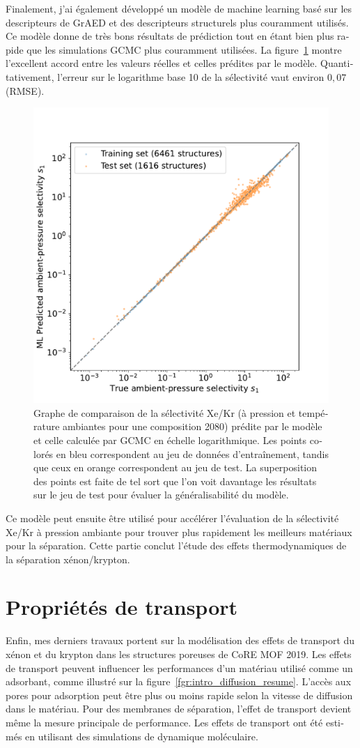 \documentclass[thesis]{subfiles}
\begin{document}
\begin{otherlanguage}{french}
Finalement, j'ai également développé un modèle de machine learning basé sur les descripteurs de GrAED et des descripteurs structurels plus couramment utilisés. Ce modèle donne de très bons résultats de prédiction tout en étant bien plus rapide que les simulations GCMC plus couramment utilisées. La figure~\ref{fgr:S1_prediction_resume} montre l'excellent accord entre les valeurs réelles et celles prédites par le modèle. Quantitativement, l'erreur sur le logarithme base 10 de la sélectivité vaut environ $0,07$ (RMSE).
\begin{figure}[ht]
\centering
    \includegraphics[width=0.48\linewidth]{figures/4-ml/SI_figure/Scatterplot_S1_prediction_logscale.pdf}
    \caption{Graphe de comparaison de la sélectivité Xe/Kr (à pression et température ambiantes pour une composition 20\pp{}80) prédite par le modèle et celle calculée par GCMC en échelle logarithmique. Les points colorés en bleu correspondent au jeu de données d'entraînement, tandis que ceux en orange correspondent au jeu de test. La superposition des points est faite de tel sort que l'on voit davantage les résultats sur le jeu de test pour évaluer la généralisabilité du modèle.}\label{fgr:S1_prediction_resume}
\end{figure}

Ce modèle peut ensuite être utilisé pour accélérer l'évaluation de la sélectivité Xe/Kr à pression ambiante pour trouver plus rapidement les meilleurs matériaux pour la séparation. Cette partie conclut l'étude des effets thermodynamiques de la séparation xénon/krypton.

\section*{Propriétés de transport}

Enfin, mes derniers travaux portent sur la modélisation des effets de transport du xénon et du krypton dans les structures poreuses de CoRE MOF 2019. Les effets de transport peuvent influencer les performances d'un matériau utilisé comme un adsorbant, comme illustré sur la figure~\ref{fgr:intro_diffusion_resume}. L'accès aux pores pour adsorption peut être plus ou moins rapide selon la vitesse de diffusion dans le matériau. Pour des membranes de séparation, l'effet de transport devient même la mesure principale de performance. Les effets de transport ont été estimés en utilisant des simulations de dynamique moléculaire.


\end{otherlanguage}
\end{document}
